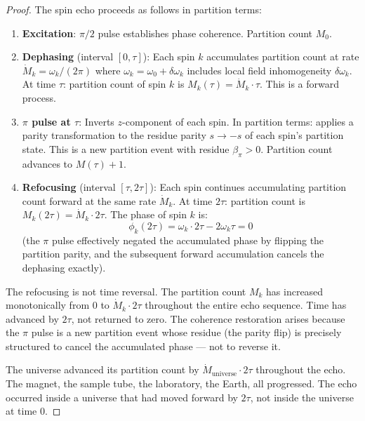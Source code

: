 \documentclass[11pt,twocolumn,a4paper]{article}
\theoremstyle{plain}
\theoremstyle{definition}
\theoremstyle{remark}
\begin{document}
\begin{proof}
The spin echo proceeds as follows in partition terms:
\begin{enumerate}
    \item \textbf{Excitation}: $\pi/2$ pulse establishes phase coherence.
          Partition count $M_0$.
    \item \textbf{Dephasing} (interval $[0,\tau]$): Each spin $k$ accumulates
          partition count at rate $\dot{M}_k = \omega_k/(2\pi)$ where $\omega_k
          = \omega_0 + \delta\omega_k$ includes local field inhomogeneity
          $\delta\omega_k$. At time $\tau$: partition count of spin $k$ is
          $M_k(\tau) = \dot{M}_k \cdot \tau$. This is a forward process.
    \item \textbf{$\pi$ pulse at $\tau$}: Inverts $z$-component of each spin.
          In partition terms: applies a parity transformation to the residue
          parity $s \to -s$ of each spin's partition state. This is a new
          partition event with residue $\beta_\pi > 0$. Partition count advances
          to $M(\tau) + 1$.
    \item \textbf{Refocusing} (interval $[\tau, 2\tau]$): Each spin continues
          accumulating partition count forward at the same rate $\dot{M}_k$.
          At time $2\tau$: partition count is $M_k(2\tau) = \dot{M}_k \cdot
          2\tau$. The phase of spin $k$ is:
          \begin{equation}
              \phi_k(2\tau) = \omega_k \cdot 2\tau - 2\omega_k\tau = 0
          \end{equation}
          (the $\pi$ pulse effectively negated the accumulated phase by flipping
          the partition parity, and the subsequent forward accumulation cancels
          the dephasing exactly).
\end{enumerate}
The refocusing is not time reversal. The partition count $M_k$ has increased
monotonically from $0$ to $\dot{M}_k \cdot 2\tau$ throughout the entire echo
sequence. Time has advanced by $2\tau$, not returned to zero. The coherence
restoration arises because the $\pi$ pulse is a new partition event whose
residue (the parity flip) is precisely structured to cancel the accumulated
phase --- not to reverse it.

The universe advanced its partition count by $\dot{M}_{\mathrm{universe}} \cdot
2\tau$ throughout the echo. The magnet, the sample tube, the laboratory, the
Earth, all progressed. The echo occurred inside a universe that had moved
forward by $2\tau$, not inside the universe at time 0.
\end{proof}
\end{document}
